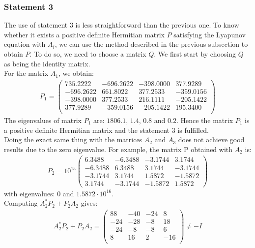 \documentclass[11pt]{article}
\begin{document}
\subsubsection*{Statement 3}
The use of statement 3 is less straightforward than the previous one. To know whether it exists a positive definite Hermitian matrix $P$ satisfying the Lyapunov equation with $A_i$, we can use the method described in the previous subsection to obtain $P$. To do so, we need to choose a matrix $Q$. We first start by choosing $Q$ as being the identity matrix.\\
For the matrix $A_1$, we obtain:
\begin{align*}
P_1=
    \begin{pmatrix}
    735.2222& -696.2622& -398.0000&  377.9289\\
    -696.2622&  661.8022&  377.2533& -359.0156\\
    -398.0000&  377.2533&  216.1111& -205.1422\\
    377.9289& -359.0156& -205.1422&  195.3400\\
    \end{pmatrix}
\end{align*}
The eigenvalues of matrix $P_1$ are: $1806.1$, $1.4$, $0.8$ and $0.2$. Hence the matrix $P_1$ is a positive definite Hermitian matrix and the statement 3 is fulfilled.\\
Doing the exact same thing with the matrices $A_2$ and $A_3$ does not achieve good results due to the zero eigenvalue. For example, the matrix P obtained with $A_2$ is:
\begin{align*}
P_2 = 10^{15}
    \begin{pmatrix}
    6.3488&   -6.3488&   -3.1744&    3.1744\\
   -6.3488&    6.3488&    3.1744&   -3.1744\\
   -3.1744&    3.1744&    1.5872&   -1.5872\\
    3.1744&   -3.1744&   -1.5872&    1.5872
    \end{pmatrix}
\end{align*}
with eigenvalues: $0$ and $1.5872\cdot 10^{16}$.\\
Computing $A_2^*P_2+P_2A_2$ gives:
\begin{align*}
    A_2^*P_2+P_2A_2=
    \begin{pmatrix}
    88&   -40&   -24&     8\\
   -24&   -28&    -8&    18\\
   -24&    -8&    -8&     6\\
     8&    16&     2&   -16\\
    \end{pmatrix}\neq -I
\end{align*}
\end{document}
